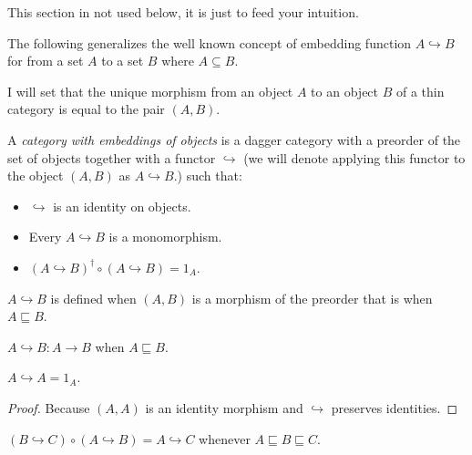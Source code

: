 \begin{note}
This section in not used below, it is just to feed your intuition.
\end{note}

The following generalizes the well known concept of embedding function $A
\hookrightarrow B$ for from a set $A$ to a set $B$ where $A \subseteq B$.

I will set that the unique morphism from an object $A$ to an object $B$ of a
thin category is equal to the pair $(A , B)$.

\begin{defn}
  A \emph{category with embeddings of objects} is a dagger category with a
  preorder of the set of objects together with a functor $\hookrightarrow$ (we
  will denote applying this functor to the object $(A , B)$ as $A
  \hookrightarrow B$.) such that:
  \begin{itemize}
    \item $\hookrightarrow$ is an identity on objects.
    
    \item Every $A \hookrightarrow B$ is a monomorphism.
    
    \item $(A \hookrightarrow B)^{\dagger} \circ (A \hookrightarrow B) = 1_A$.
  \end{itemize}
\end{defn}

\begin{obvious}
$A\hookrightarrow B$ is defined when $(A , B)$ is a morphism of the preorder
that is when $A \sqsubseteq B$.
\end{obvious}

\begin{obvious}
$A \hookrightarrow B : A \rightarrow B$ when $A \sqsubseteq B$.
\end{obvious}

\begin{prop}
  $A \hookrightarrow A = 1_A$.
\end{prop}

\begin{proof}
  Because $(A , A)$ is an identity morphism and $\hookrightarrow$ preserves
  identities.
\end{proof}

\begin{prop}
  $(B \hookrightarrow C) \circ (A \hookrightarrow B) = A \hookrightarrow C$
  whenever $A \sqsubseteq B \sqsubseteq C$.
\end{prop}

